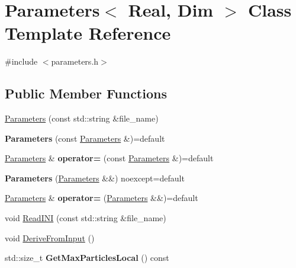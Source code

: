 \hypertarget{classParameters}{}\section{Parameters$<$ Real, Dim $>$ Class Template Reference}
\label{classParameters}


{\ttfamily \#include $<$parameters.\+h$>$}

\subsection*{Public Member Functions}
\begin{DoxyCompactItemize}
\item 
\hyperlink{classParameters_ab3d9610c0f207ebfe5ea49d8d612a847}{Parameters} (const std\+::string \&file\+\_\+name)
\item 
\hypertarget{classParameters_a0427f6101af0cc0c15328e8573a3a06f}{}{\bfseries Parameters} (const \hyperlink{classParameters}{Parameters} \&)=default\label{classParameters_a0427f6101af0cc0c15328e8573a3a06f}

\item 
\hypertarget{classParameters_ab357e63f88e9ebc896ba637d28aac627}{}\hyperlink{classParameters}{Parameters} \& {\bfseries operator=} (const \hyperlink{classParameters}{Parameters} \&)=default\label{classParameters_ab357e63f88e9ebc896ba637d28aac627}

\item 
\hypertarget{classParameters_ad73ef9f78374903932b3ac647b15e370}{}{\bfseries Parameters} (\hyperlink{classParameters}{Parameters} \&\&) noexcept=default\label{classParameters_ad73ef9f78374903932b3ac647b15e370}

\item 
\hypertarget{classParameters_a955dbc2b6a05ee42432586a9d46c57ec}{}\hyperlink{classParameters}{Parameters} \& {\bfseries operator=} (\hyperlink{classParameters}{Parameters} \&\&)=default\label{classParameters_a955dbc2b6a05ee42432586a9d46c57ec}

\item 
void \hyperlink{classParameters_a4ee29430ab25040954069c3a28a39644}{Read\+I\+N\+I} (const std\+::string \&file\+\_\+name)
\item 
void \hyperlink{classParameters_a667077fd07b8e3a7c895e5f7b5994574}{Derive\+From\+Input} ()
\item 
\hypertarget{classParameters_a9f69b8796ce2086e5c424dedea483b76}{}std\+::size\+\_\+t {\bfseries Get\+Max\+Particles\+Local} () const \label{classParameters_a9f69b8796ce2086e5c424dedea483b76}


\end{DoxyCompactItemize}
